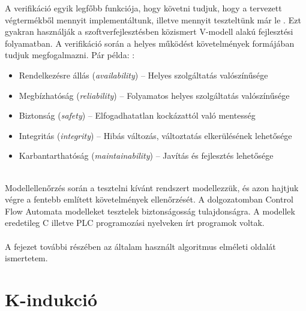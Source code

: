 A verifikáció egyik legfőbb funkciója, hogy követni tudjuk, hogy a tervezett végtermékből mennyit implementáltunk, illetve mennyit teszteltünk már le \cite{DenkeAkos14}. Ezt gyakran használják a szoftverfejlesztésben közismert V-modell alakú fejlesztési folyamatban. A verifikáció során a helyes működést követelmények formájában tudjuk megfogalmazni. Pár példa: \cite{alapfogalmak}:
\begin{itemize}
	\item Rendelkezésre állás (\emph{availability}) -- Helyes szolgáltatás valószínűsége
	\item Megbízhatóság (\emph{reliability}) -- Folyamatos helyes szolgáltatás valószínűsége
	\item Biztonság (\emph{safety}) -- Elfogadhatatlan kockázattól való mentesség
	\item Integritás (\emph{integrity}) -- Hibás változás, változtatás elkerülésének lehetősége
	\item Karbantarthatóság (\emph{maintainability}) -- Javítás és fejlesztés lehetősége
\end{itemize}
\ \\
Modellellenőrzés során a tesztelni kívánt rendszert modellezzük, és azon hajtjuk végre a fentebb említett követelmények ellenőrzését. A dolgozatomban Control Flow Automata modelleket tesztelek biztonságosság tulajdonságra. A modellek eredetileg C illetve PLC programozási nyelveken írt programok voltak.
\\
\\
A fejezet további részében az általam használt algoritmus elméleti oldalát ismertetem.

\section{K-indukció}
\label{sec:k_induction}


